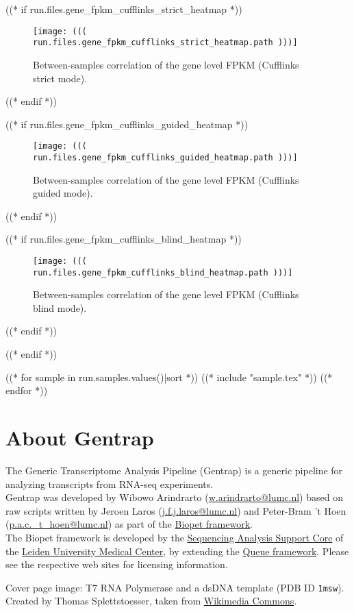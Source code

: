 \documentclass[a4paper,12pt]{article}
\begin{document}
((* if run.files.gene_fpkm_cufflinks_strict_heatmap *))
\begin{figure}[h!]
    \centering
    \texttt{[image: ((( run.files.gene\_fpkm\_cufflinks\_strict\_heatmap.path )))]}
    \caption{Between-samples correlation of the gene level FPKM (Cufflinks strict mode).}
\end{figure}
((* endif *))

((* if run.files.gene_fpkm_cufflinks_guided_heatmap *))
\begin{figure}[h!]
    \centering
    \texttt{[image: ((( run.files.gene\_fpkm\_cufflinks\_guided\_heatmap.path )))]}
    \caption{Between-samples correlation of the gene level FPKM (Cufflinks guided mode).}
\end{figure}
((* endif *))

((* if run.files.gene_fpkm_cufflinks_blind_heatmap *))
\begin{figure}[h!]
    \centering
    \texttt{[image: ((( run.files.gene\_fpkm\_cufflinks\_blind\_heatmap.path )))]}
    \caption{Between-samples correlation of the gene level FPKM (Cufflinks blind mode).}
\end{figure}
((* endif *))

((* endif *))

\clearpage

((* for sample in run.samples.values()|sort *))
((* include "sample.tex" *))
\clearpage
((* endfor *))


\part{About Gentrap}
\label{apx:about}

The Generic Transcriptome Analysis Pipeline (Gentrap) is a
generic pipeline for analyzing transcripts from RNA-seq experiments. \\

Gentrap was developed by Wibowo Arindrarto (\href{mailto:w.arindrarto@lumc.nl}{w.arindrarto@lumc.nl})
based on raw scripts written by Jeroen Laros
(\href{mailto:j.f.j.laros@lumc.nl}{j.f.j.laros@lumc.nl}) and
Peter-Bram 't Hoen
(\href{mailto:p.a.c._t_hoen@lumc.nl}{p.a.c._t_hoen@lumc.nl}) as part of the
\href{https://git.lumc/nl/biopet/biopet}{Biopet framework}. \\

The Biopet framework is developed by the
\href{http://sasc.lumc.nl}{Sequencing Analysis Support Core} of the
\href{http://lumc.nl}{Leiden University Medical Center}, by extending the
\href{http://http://gatkforums.broadinstitute.org/discussion/1306/overview-of-queue}{Queue framework}.
Please see the respective web sites for licensing information.

\indent

Cover page image: T7 RNA Polymerase and a dsDNA template (PDB ID \texttt{1msw}).
Created by Thomas Splettstoesser, taken from
\href{http://commons.wikimedia.org/wiki/File:T7_RNA_polymerase.jpg}{Wikimedia Commons}.
\end{document}
